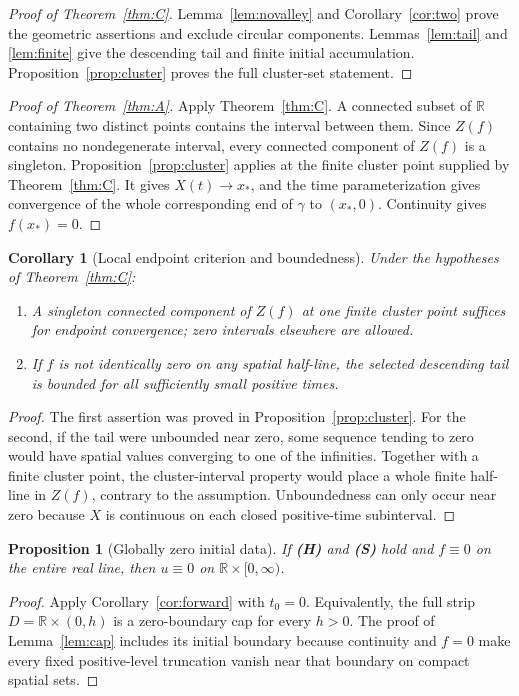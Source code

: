 \documentclass[11pt,reqno]{amsart}
\numberwithin{equation}{section}
\newtheorem{proposition}[theorem]{Proposition}
\newtheorem{corollary}[theorem]{Corollary}
\theoremstyle{definition}
\theoremstyle{remark}
\newcommand{\R}{\mathbb R}
\begin{document}
\begin{proof}[Proof of Theorem~\ref{thm:C}]
Lemma~\ref{lem:novalley} and Corollary~\ref{cor:two} prove the geometric assertions and exclude circular components. Lemmas~\ref{lem:tail} and \ref{lem:finite} give the descending tail and finite initial accumulation. Proposition~\ref{prop:cluster} proves the full cluster-set statement.
\end{proof}

\begin{proof}[Proof of Theorem~\ref{thm:A}]
Apply Theorem~\ref{thm:C}. A connected subset of $\R$ containing two distinct points contains the interval between them. Since $Z(f)$ contains no nondegenerate interval, every connected component of $Z(f)$ is a singleton. Proposition~\ref{prop:cluster} applies at the finite cluster point supplied by Theorem~\ref{thm:C}. It gives $X(t)\to x_*$, and the time parameterization gives convergence of the whole corresponding end of $\gamma$ to $(x_*,0)$. Continuity gives $f(x_*)=0$.
\end{proof}

\begin{corollary}[Local endpoint criterion and boundedness]\label{cor:refinements}
Under the hypotheses of Theorem~\ref{thm:C}:
\begin{enumerate}
\item A singleton connected component of $Z(f)$ at one finite cluster point suffices for endpoint convergence; zero intervals elsewhere are allowed.
\item If $f$ is not identically zero on any spatial half-line, the selected descending tail is bounded for all sufficiently small positive times.
\end{enumerate}
\end{corollary}
\begin{proof}
The first assertion was proved in Proposition~\ref{prop:cluster}. For the second, if the tail were unbounded near zero, some sequence tending to zero would have spatial values converging to one of the infinities. Together with a finite cluster point, the cluster-interval property would place a whole finite half-line in $Z(f)$, contrary to the assumption. Unboundedness can only occur near zero because $X$ is continuous on each closed positive-time subinterval.
\end{proof}

\begin{proposition}[Globally zero initial data]\label{prop:zero}
If \textbf{(H)} and \textbf{(S)} hold and $f\equiv0$ on the entire real line, then $u\equiv0$ on $\R\times[0,\infty)$.
\end{proposition}
\begin{proof}
Apply Corollary~\ref{cor:forward} with $t_0=0$. Equivalently, the full strip $D=\R\times(0,h)$ is a zero-boundary cap for every $h>0$. The proof of Lemma~\ref{lem:cap} includes its initial boundary because continuity and $f=0$ make every fixed positive-level truncation vanish near that boundary on compact spatial sets.
\end{proof}
\end{document}
